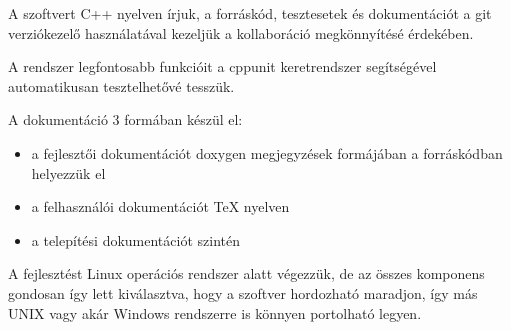 \documentclass[a4paper,12pt]{article}
\begin{document}
A szoftvert C++ nyelven írjuk, a forráskód, tesztesetek és dokumentációt a git
verziókezelő használatával kezeljük a kollaboráció megkönnyítésé érdekében.

A rendszer legfontosabb funkcióit a cppunit keretrendszer segítségével
automatikusan tesztelhetővé tesszük.

A dokumentáció 3 formában készül el:
\begin{itemize}
\item a fejlesztői dokumentációt doxygen megjegyzések formájában a forráskódban
helyezzük el
\item a felhasználói dokumentációt \TeX{} nyelven
\item a telepítési dokumentációt szintén
\end{itemize}

A fejlesztést Linux operációs rendszer alatt végezzük, de az összes komponens
gondosan így lett kiválasztva, hogy a szoftver hordozható maradjon, így más
UNIX vagy akár Windows rendszerre is könnyen portolható legyen.
\end{document}

